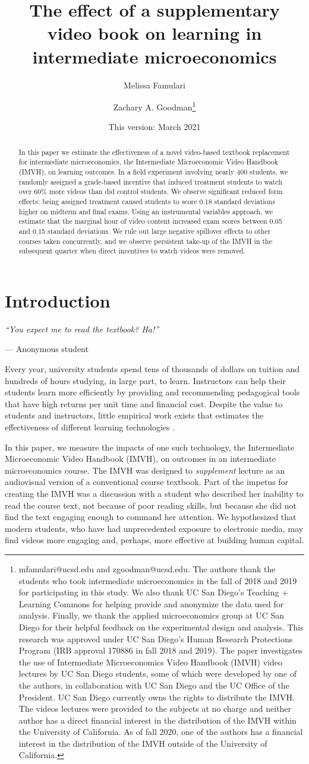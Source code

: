 \documentclass[12pt]{article}
\title{The effect of a supplementary video book on learning in intermediate microeconomics}
\author{Melissa Famulari}
\author{Zachary A. Goodman\thanks{mfamulari@ucsd.edu and zgoodman@ucsd.edu. The authors thank the students who took intermediate microeconomics in the fall of 2018 and 2019 for participating in this study. We also thank UC San Diego's Teaching + Learning Commons for helping provide and anonymize the data used for analysis. Finally, we thank the applied microeconomics group at UC San Diego for their helpful feedback on the experimental design and analysis. This research was approved under UC San Diego's Human Research Protections Program (IRB approval 170886 in fall 2018 and 2019). The paper investigates the use of Intermediate Microeconomics Video Handbook (IMVH) video lectures by UC San Diego students, some of which were developed by one of the authors, in collaboration with UC San Diego and the UC Office of the President. UC San Diego currently owns the rights to distribute the IMVH. The videos lectures were provided to the subjects at no charge and neither author has a direct financial interest in the distribution of the IMVH within the University of California. As of fall 2020, one of the authors has a financial interest in the distribution of the IMVH outside of the University of California.}}
\affil{University of California, San Diego}
\date{This version: March 2021} %
\begin{document}

\maketitle
\begin{abstract}
	In this paper we estimate the effectiveness of a novel video-based textbook replacement for intermediate microeconomics, the Intermediate Microeconomic Video Handbook (IMVH), on learning outcomes. In a field experiment involving nearly 400 students, we randomly assigned a grade-based incentive that induced treatment students to watch over 60\% more videos than did control students. We observe significant reduced form effects: being assigned treatment caused students to score 0.18 standard deviations higher on midterm and final exams. Using an instrumental variables approach, we estimate that the marginal hour of video content increased exam scores between 0.05 and 0.15 standard deviations. We rule out large negative spillover effects to other courses taken concurrently, and we observe persistent take-up of the IMVH in the subsequent quarter when direct incentives to watch videos were removed.
\end{abstract}


\section{Introduction}

\epigraph{\textit{``You expect me to read the textbook? Ha!''}}{--- Anonymous student}\bigskip

Every year, university students spend tens of thousands of dollars on tuition and hundreds of hours studying, in large part, to learn. Instructors can help their students learn more efficiently by providing and recommending pedagogical tools that have high returns per unit time and financial cost. Despite the value to students and instructors, little empirical work exists that estimates the effectiveness of different learning technologies \parencite{aws2015}.

In this paper, we measure the impacts of one such technology, the Intermediate Microeconomic Video Handbook (IMVH), on outcomes in an intermediate microeconomics course. The IMVH was designed to \textit{supplement} lecture as an audiovisual version of a conventional course textbook. Part of the impetus for creating the IMVH was a discussion with a student who described her inability to read the course text, not because of poor reading skills, but because she did not find the text engaging enough to command her attention. We hypothesized that modern students, who have had unprecedented exposure to electronic media, may find videos more engaging and, perhaps, more effective at building human capital.
\end{document}
